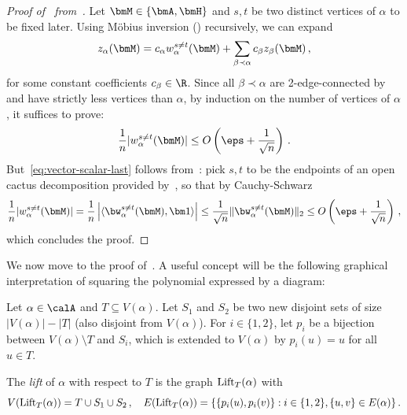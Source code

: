 \begin{proof}[Proof of~ from~]
    Let $\bmM\in \{\bmA, \bmH\}$ and
    $s,t$ be two distinct vertices of $\alpha$ to be fixed later. Using M\"{o}bius inversion
    ()
    recursively, we can expand
    \[
        z_\alpha(\bmM) = c_{\alpha} w_\alpha^{s\neq t}(\bmM) + \sum_{\beta \prec \alpha} c_{\beta} z_{\beta}(\bmM)\,,
    \]
    for some constant coefficients $c_\beta \in \R$. Since all $\beta\prec \alpha$ are
    2-edge-connected by~ and have
    strictly less vertices than $\alpha$, by induction on
    the number of vertices of $\alpha$,
    it suffices to prove:
    \begin{align}
        \frac 1n |w^{s\neq t}_\alpha(\bmM)|\le O\left(\eps + \frac 1 {\sqrt n}\right)\,.\label{eq:vector-scalar-last}
    \end{align}
    But~\cref{eq:vector-scalar-last} follows
    from~: pick $s,t$
    to be the endpoints of an open cactus decomposition provided by~, so that by Cauchy-Schwarz
    \[
        \frac 1n |w^{s\neq t}_\alpha(\bmM)| = \frac 1 n \left|\langle \bw_\alpha^{s\neq t}(\bmM),\bm1\rangle\right|\le \frac 1 {\sqrt n} \|\bw_\alpha^{s\neq t}(\bmM)\|_2\le O\left(\eps + \frac 1 {\sqrt n}\right)\,,
    \]
    which concludes the proof.
\end{proof}

We now move to the proof of~. A useful concept will be the following
graphical interpretation of squaring the polynomial expressed by a diagram:

\newcommand\lift{\textnormal{Lift}}

\begin{definition}[Lift]
    \label{def:lift}
    Let $\alpha\in\calA$ and $T\subseteq V(\alpha)$. Let $S_1$ and
    $S_2$ be two new disjoint sets of size $|V(\alpha)|-|T|$ (also disjoint from $V(\alpha)$). For $i\in \{1,2\}$, let $p_i$ be a bijection between $V(\alpha)\setminus T$ and $S_i$, which is extended to $V(\alpha)$
    by $p_i(u)=u$ for
    all $u\in T$.

    The
    {\em lift} of $\alpha$ with respect to $T$
    is the graph $\lift_T(\alpha)$ with
    \[
    V(\lift_T(\alpha)) = T\cup S_1\cup S_2\,,\quad
        E(\lift_T(\alpha)) = \{\{p_i(u), p_i(v)\} : i\in \{1,2\}, \{u, v\}\in E(\alpha)\}\,.
    \]
\end{definition}

